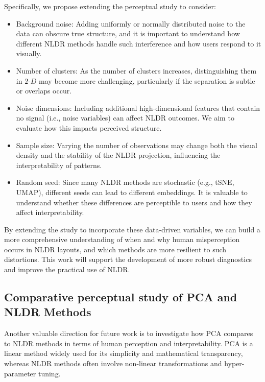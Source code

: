 \documentclass[
  11pt,
  a4paper,
]{report}
\begin{document}
Specifically, we propose extending the perceptual study to consider:

\begin{itemize}
\item
  Background noise: Adding uniformly or normally distributed noise to
  the data can obscure true structure, and it is important to understand
  how different NLDR methods handle such interference and how users
  respond to it visually.
\item
  Number of clusters: As the number of clusters increases,
  distinguishing them in \(2\text{-}D\) may become more challenging,
  particularly if the separation is subtle or overlaps occur.
\item
  Noise dimensions: Including additional high-dimensional features that
  contain no signal (i.e., noise variables) can affect NLDR outcomes. We
  aim to evaluate how this impacts perceived structure.
\item
  Sample size: Varying the number of observations may change both the
  visual density and the stability of the NLDR projection, influencing
  the interpretability of patterns.
\item
  Random seed: Since many NLDR methods are stochastic (e.g., tSNE,
  UMAP), different seeds can lead to different embeddings. It is
  valuable to understand whether these differences are perceptible to
  users and how they affect interpretability.
\end{itemize}

By extending the study to incorporate these data-driven variables, we
can build a more comprehensive understanding of when and why human
misperception occurs in NLDR layouts, and which methods are more
resilient to such distortions. This work will support the development of
more robust diagnostics and improve the practical use of NLDR.

\subsection{Comparative perceptual study of PCA and NLDR
Methods}\label{comparative-perceptual-study-of-pca-and-nldr-methods}

Another valuable direction for future work is to investigate how PCA
compares to NLDR methods in terms of human perception and
interpretability. PCA is a linear method widely used for its simplicity
and mathematical transparency, whereas NLDR methods often involve
non-linear transformations and hyper-parameter tuning.
\end{document}
